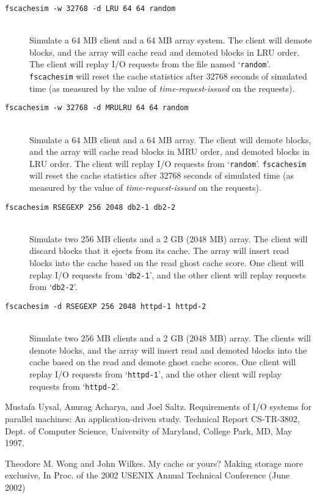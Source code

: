\documentclass[twoside]{article}
\newcommand{\fscachesim}{\texttt{fscachesim}}
\begin{document}
\begin{description}

\item[\texttt{\fscachesim{} -w 32768 -d LRU 64 64 random}] \quad\\ Simulate a
64 MB client and a 64 MB array system. The client will demote blocks, and
the array will cache read and demoted blocks in LRU order. The client will
replay I/O requests from the file named `\texttt{random}'. \fscachesim{}
will reset the cache statistics after 32768 seconds of simulated time (as
measured by the value of \textit{time-request-issued} on the requests).

\item[\texttt{\fscachesim{} -w 32768 -d MRULRU 64 64 random}] \quad\\
Simulate a 64 MB client and a 64 MB array. The client will demote blocks,
and the array will cache read blocks in MRU order, and demoted blocks in
LRU order. The client will replay I/O requests from
`\texttt{random}'. \fscachesim{} will reset the cache statistics after
32768 seconds of simulated time (as measured by the value of
\textit{time-request-issued} on the requests).

\item[\texttt{\fscachesim{} RSEGEXP 256 2048 db2-1 db2-2}] \quad\\ Simulate
two 256 MB clients and a 2 GB (2048 MB) array. The client will discard
blocks that it ejects from its cache. The array will insert read blocks
into the cache based on the read ghost cache score. One client will replay
I/O requests from `\texttt{db2-1}', and the other client will replay
requests from `\texttt{db2-2}'.

\item[\texttt{\fscachesim{} -d RSEGEXP 256 2048 httpd-1 httpd-2}] \quad\\
Simulate two 256 MB clients and a 2 GB (2048 MB) array. The clients will
demote blocks, and the array will insert read and demoted blocks into the
cache based on the read and demote ghost cache scores. One client will
replay I/O requests from `\texttt{httpd-1}', and the other client will
replay requests from `\texttt{httpd-2}'.

\end{description}

\begin{thebibliography}{UAS97}

Mustafa Uysal, Anurag Acharya, and Joel Saltz.
\newblock Requirements of {I/O} systems for parallel machines: An
  application-driven study.
\newblock Technical Report CS-TR-3802, Dept. of Computer Science, University of
  Maryland, College Park, MD, May 1997.

Theodore M. Wong and John Wilkes.
\newblock My cache or yours? Making storage more exclusive,
\newblock In Proc. of the 2002 USENIX Annual Technical Conference (June 2002)

\end{thebibliography}
\end{document}
